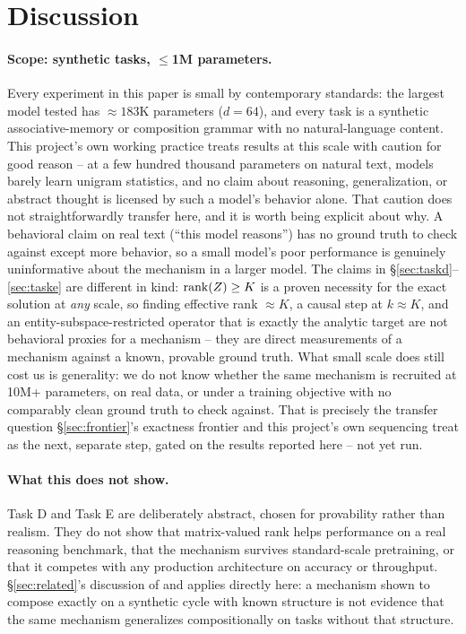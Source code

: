 \section{Discussion}
\label{sec:discussion}

\paragraph{Scope: synthetic tasks, $\leq$1M parameters.} Every experiment
in this paper is small by contemporary standards: the largest model tested
has $\approx183$K parameters ($d{=}64$), and every task is a synthetic
associative-memory or composition grammar with no natural-language content.
This project's own working practice treats results at this scale with
caution for good reason -- at a few hundred thousand parameters on natural
text, models barely learn unigram statistics, and no claim about
reasoning, generalization, or abstract thought is licensed by such a
model's behavior alone. That caution does not straightforwardly transfer
here, and it is worth being explicit about why. A behavioral claim on real
text (``this model reasons'') has no ground truth to check against except
more behavior, so a small model's poor performance is genuinely
uninformative about the mechanism in a larger model. The claims in
\S\ref{sec:taskd}--\ref{sec:taske} are different in kind: $\operatorname{rank}(Z)\geq K$
is a proven necessity for the exact solution at \emph{any} scale, so
finding effective rank $\approx K$, a causal step at $k\approx K$, and an
entity-subspace-restricted operator that is exactly the analytic target
are not behavioral proxies for a mechanism -- they are direct measurements
of a mechanism against a known, provable ground truth. What small scale
does still cost us is generality: we do not know whether the same
mechanism is recruited at 10M+ parameters, on real data, or under a
training objective with no comparably clean ground truth to check against.
That is precisely the transfer question \S\ref{sec:frontier}'s exactness
frontier and this project's own sequencing treat as the next, separate
step, gated on the results reported here -- not yet run.

\paragraph{What this does not show.} Task D and Task E are deliberately
abstract, chosen for provability rather than realism. They do not show
that matrix-valued rank helps performance on a real reasoning benchmark,
that the mechanism survives standard-scale pretraining, or that it competes
with any production architecture on accuracy or throughput. \S\ref{sec:related}'s
discussion of \citet{dziri2023faithfate} and \citet{wang2024grokked}
applies directly here: a mechanism shown to compose exactly on a synthetic
cycle with known structure is not evidence that the same mechanism
generalizes compositionally on tasks without that structure.


